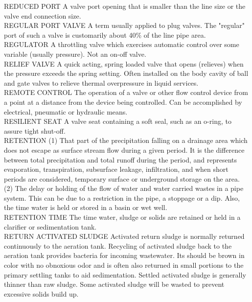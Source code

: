 REDUCED PORT
A valve port opening that is smaller than the line size or the valve end connection size.
\vspace{0.3cm}\\
REGULAR PORT VALVE
A term usually applied to plug valves. The "regular" port of such a valve is customarily about 40\% of the line pipe area.
\vspace{0.3cm}\\
REGULATOR
A throttling valve which exercises automatic control over some variable (usually pressure). Not an on-off valve.
\vspace{0.3cm}\\
RELIEF VALVE
A quick acting, spring loaded valve that opens (relieves) when the pressure exceeds the spring setting. Often installed on the body cavity of ball and gate valves to relieve thermal overpressure in liquid services.
\vspace{0.3cm}\\
REMOTE CONTROL
The operation of a valve or other flow control device from a point at a distance from the device being controlled. Can be accomplished by electrical, pneumatic or hydraulic means.
\vspace{0.3cm}\\
RESILIENT SEAT
A valve seat containing a soft seal, such as an o-ring, to assure tight shut-off.
\vspace{0.3cm}\\
RETENTION
(1) That part of the precipitation falling on a drainage area which does not escape as surface stream flow during a given period. It is the difference between total precipitation and total runoff during the period, and represents evaporation, transpiration, subsurface leakage, infiltration, and when short periods are considered, temporary surface or underground storage on the area. (2) The delay or holding of the flow of water and water carried wastes in a pipe system. This can be due to a restriction in the pipe, a stoppage or a dip. Also, the time water is held or stored in a basin or wet well. 
\vspace{0.3cm}\\
RETENTION TIME
The time water, sludge or solids are retained or held in a clarifier or sedimentation tank.
\vspace{0.3cm}\\
RETURN ACTIVATED SLUDGE
Activated return sludge is normally returned continuously to the aeration tank. Recycling of activated sludge back to the aeration tank provides bacteria for incoming wastewater. Its should be brown in color with no obnoxious odor and is often also returned in small portions to the primary settling tanks to aid sedimentation. Settled activated sludge is generally thinner than raw sludge. Some activated sludge will be wasted to prevent excessive solids build up.
